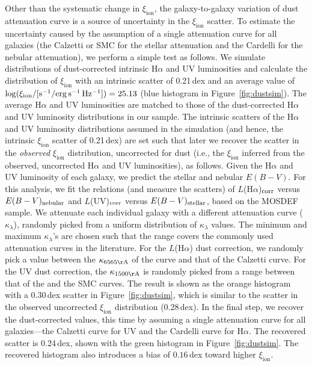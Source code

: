 \documentclass[iop]{emulateapj}
\newcommand{\xiion}{\ensuremath{\xi_{\mathrm{ion}}}}
\newcommand{\halpha}{H\ensuremath{\alpha}}
\begin{document}
Other than the systematic change in {\xiion}, the galaxy-to-galaxy variation of dust attenuation curve is a source of uncertainty in the {\xiion} scatter. 
To estimate the uncertainty caused by the assumption of a single attenuation curve for all galaxies (the Calzetti or SMC for the stellar attenuation and the Cardelli for the nebular attenuation), we perform a simple test as follows. We simulate distributions of dust-corrected intrinsic {\halpha} and UV luminosities and calculate the distribution of {\xiion} with an intrinsic scatter of 0.21\,dex and an average value of $\log(\xi_{\rm{ion}}/[{\rm{s^{-1}/erg\,s^{-1}\,Hz^{-1}}}])=25.13$ (blue histogram in Figure~\ref{fig:dustsim}). 
The average {\halpha} and UV luminosities are matched to those of the dust-corrected {\halpha} and UV luminosity distributions in our sample. 
The intrinsic scatters of the {\halpha} and UV luminosity distributions assumed in the simulation (and hence, the intrinsic {\xiion} scatter of 0.21\,dex) are set such that later we recover the scatter in the {\em observed} {\xiion} distribution, uncorrected for dust (i.e., the {\xiion} inferred from the observed, uncorrected {\halpha} and UV luminosities), as follows.
Given the {\halpha} and UV luminosity of each galaxy, we predict the stellar and nebular $E(B-V)$. For this analysis, we fit the relations (and measure the scatters) of $L$({\halpha})$_{\rm corr}$ versus $E(B-V)_{\rm nebular}$ and $L$(UV)$_{\rm corr}$ versus $E(B-V)_{\rm stellar}$, based on the MOSDEF sample.
We attenuate each individual galaxy with a different attenuation curve ($\kappa_{\lambda}$), randomly picked from a uniform distribution of $\kappa_{\lambda}$ values.
The minimum and maximum $\kappa_{\lambda}$'s are chosen such that the range covers the commonly used attenuation curves in the literature. For the $L$({\halpha}) dust correction, we randomly pick a value between the $\kappa_{6565{\rm \AA}}$ of the \citet{reddy15} curve and that of the Calzetti curve. For the UV dust correction, the $\kappa_{1500{\rm \AA}}$ is randomly picked from a range between that of the \citet{reddy15} and the SMC curves. The result is shown as the orange histogram with a 0.30\,dex scatter in Figure~\ref{fig:dustsim}, which is similar to the scatter in the observed uncorrected {\xiion} distribution (0.28\,dex). In the final step, we recover the dust-corrected values, this time by assuming a single attenuation curve for all galaxies---the Calzetti curve for UV and the Cardelli curve for {\halpha}. The recovered scatter is 0.24\,dex, shown with the green histogram in Figure~\ref{fig:dustsim}. The recovered histogram also introduces a bias of $0.16$\,dex toward higher {\xiion}.
\end{document}
